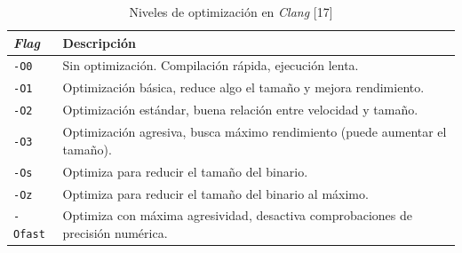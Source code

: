 \begin{table}[H]
\centering
\small
\begin{tabularx}{\linewidth}{|l|Y|}
\hline
\textbf{\emph{Flag}} & \textbf{Descripción} \\
\hline
\texttt{-O0} & Sin optimización. Compilación rápida, ejecución lenta. \\
\texttt{-O1} & Optimización básica, reduce algo el tamaño y mejora rendimiento. \\
\texttt{-O2} & Optimización estándar, buena relación entre velocidad y tamaño. \\
\texttt{-O3} & Optimización agresiva, busca máximo rendimiento (puede aumentar el tamaño). \\
\texttt{-Os} & Optimiza para reducir el tamaño del binario. \\
\texttt{-Oz} & Optimiza para reducir el tamaño del binario al máximo. \\
\texttt{-Ofast} & Optimiza con máxima agresividad, desactiva comprobaciones de precisión numérica. \\
\hline
\end{tabularx}
\caption{Niveles de optimización en \emph{Clang} [17]}
\label{tab:clang_optimizacion}
\end{table}

